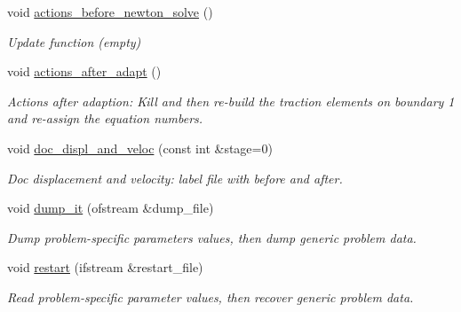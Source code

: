 \begin{DoxyCompactItemize}
void \hyperlink{classDiskShockWaveProblem_a50ba8e9b29ff7796fa9cb7ede8598376}{actions\+\_\+before\+\_\+newton\+\_\+solve} ()
\begin{DoxyCompactList}\small\item\em Update function (empty) \end{DoxyCompactList}\item 
void \hyperlink{classDiskShockWaveProblem_ac2a22a8399355e461d1a9ad1e5425c9a}{actions\+\_\+after\+\_\+adapt} ()
\begin{DoxyCompactList}\small\item\em Actions after adaption\+: Kill and then re-\/build the traction elements on boundary 1 and re-\/assign the equation numbers. \end{DoxyCompactList}\item 
void \hyperlink{classDiskShockWaveProblem_a75403423b0a031adabb5b487fa88373f}{doc\+\_\+displ\+\_\+and\+\_\+veloc} (const int \&stage=0)
\begin{DoxyCompactList}\small\item\em Doc displacement and velocity\+: label file with before and after. \end{DoxyCompactList}\item 
void \hyperlink{classDiskShockWaveProblem_a2eaf91d3e0eb5f37b9920fc3d9d54cb9}{dump\+\_\+it} (ofstream \&dump\+\_\+file)
\begin{DoxyCompactList}\small\item\em Dump problem-\/specific parameters values, then dump generic problem data. \end{DoxyCompactList}\item 
void \hyperlink{classDiskShockWaveProblem_ae883625e9bbe6ea442413f7c970d3fb1}{restart} (ifstream \&restart\+\_\+file)
\begin{DoxyCompactList}\small\item\em Read problem-\/specific parameter values, then recover generic problem data. \end{DoxyCompactList}\end{DoxyCompactItemize}
